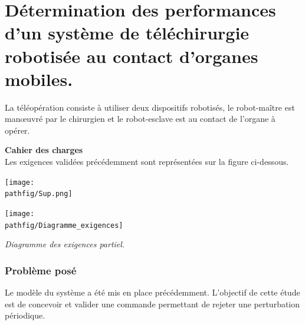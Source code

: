 \documentclass[10pt,fleqn]{article} %
\begin{document}

\vspace{4cm}
\pagestyle{fancy}
\thispagestyle{plain}
\def\pathfig{images2}
\def\columnseprulecolor{\color{ocre}}
\setlength{\columnseprule}{0.4pt} 


\section{Détermination des performances d'un système de téléchirurgie robotisée au contact d'organes mobiles.}


\noindent \begin{minipage}[c]{.6\linewidth}

 La téléopération consiste à utiliser deux dispositifs robotisés, le robot-maître est manœuvré par le chirurgien et le robot-esclave est au contact de l'organe à opérer.

\textbf{Cahier des charges\\}
Les exigences validées précédemment sont représentées sur la figure ci-dessous.

\end{minipage} \hfill
\begin{minipage}[c]{.4\linewidth}
\begin{center}
\texttt{[image: \\pathfig/Sup.png]}

\end{center}
\end{minipage}


\begin{center}%
\texttt{[image: \\pathfig/Diagramme\_exigences]}

\textit{Diagramme des exigences partiel.}
\label{chap2:tele:req}
\end{center}




\subsubsection*{Problème posé}
\begin{obj}
Le modèle du système a été mis en place précédemment. L'objectif de cette étude est de concevoir et valider une commande permettant de
rejeter une perturbation périodique. 
\end{obj}
\end{document}
